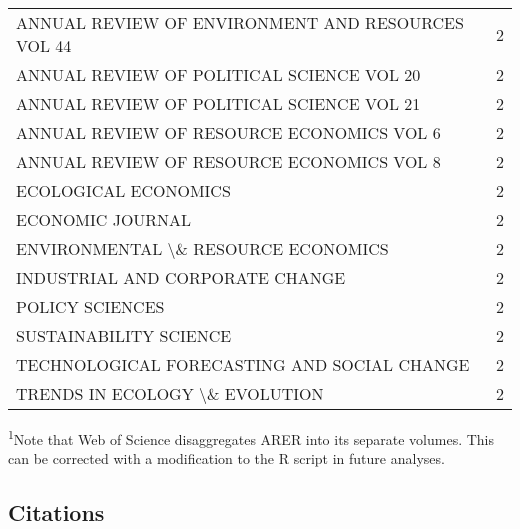 \documentclass[]{article}
\begin{document}
\begin{longtable}{lc}
ANNUAL REVIEW OF ENVIRONMENT AND RESOURCES VOL 44 & 2 \\ 
ANNUAL REVIEW OF POLITICAL SCIENCE VOL 20 & 2 \\ 
ANNUAL REVIEW OF POLITICAL SCIENCE VOL 21 & 2 \\ 
ANNUAL REVIEW OF RESOURCE ECONOMICS VOL 6 & 2 \\ 
ANNUAL REVIEW OF RESOURCE ECONOMICS VOL 8 & 2 \\ 
ECOLOGICAL ECONOMICS & 2 \\ 
ECONOMIC JOURNAL & 2 \\ 
ENVIRONMENTAL \textbackslash \& RESOURCE ECONOMICS & 2 \\ 
INDUSTRIAL AND CORPORATE CHANGE & 2 \\ 
POLICY SCIENCES & 2 \\ 
SUSTAINABILITY SCIENCE & 2 \\ 
TECHNOLOGICAL FORECASTING AND SOCIAL CHANGE & 2 \\ 
TRENDS IN ECOLOGY \textbackslash \& EVOLUTION & 2 \\ 
\bottomrule
\end{longtable}
\vspace{-5mm}
\begin{minipage}{\linewidth}
\textsuperscript{1}Note that Web of Science disaggregates ARER into its separate volumes. This can be corrected with a modification to the R script in future analyses. \\ 
\end{minipage}

\hypertarget{citations}{%
\subsection{Citations}\label{citations}}
\end{document}
